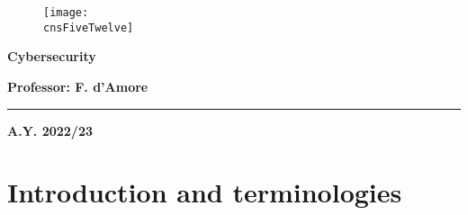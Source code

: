 

	
	\begin{center}
		\begin{figure}[h]
			\centering
			\texttt{[image: \\cnsFiveTwelve]}
		\end{figure}
		\vspace{1cm} 
		{\fontsize{28}{34}\selectfont \textbf{Cybersecurity}}
	\end{center}

	\vspace{1cm} 
	
	\begin{center}
	{\fontsize{22}{28}\selectfont \textbf{Professor: F. d'Amore}}
	\end{center}

	\vspace{1cm} 

	\textcolor{blue!60!black}{\rule{\linewidth}{2pt}}
	
	\vspace{10cm} 
	
	\begin{center}
	\textbf{A.Y. 2022/23}
	\end{center}

	\thispagestyle{empty}
	
	\newpage
	
	\myTOC

	\newpage
	\section{Introduction and terminologies}
	
	\newpage
